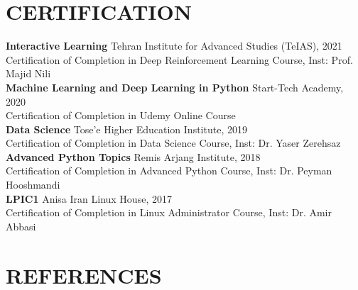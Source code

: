 \documentclass[11pt]{article}
\begin{document}
\section{CERTIFICATION}  

\textbf{Interactive Learning}  \hfill Tehran Institute for Advanced Studies (TeIAS), 2021\\
Certification of Completion in Deep Reinforcement Learning Course, Inst: Prof. Majid Nili	\href{https://scholar.google.com/citations?user=QlwWxmoAAAAJ&hl=en}{\small \faExternalLink}\\
\textbf{Machine Learning and Deep Learning in Python}  \hfill Start-Tech Academy, 2020\\
Certification of Completion in Udemy Online Course\\
\textbf{Data Science} \hfill Tose’e Higher Education Institute, 2019\\
Certification of Completion in Data Science Course, Inst: Dr. Yaser Zerehsaz \href{https://scholar.google.com/citations?user=QlwWxmoAAAAJ&hl=en}{\small \faExternalLink}\\
\textbf{Advanced Python Topics} \hfill Remis Arjang Institute, 2018\\
Certification of Completion in Advanced Python Course, Inst: Dr. Peyman Hooshmandi\\
\textbf{LPIC1} \hfill Anisa Iran Linux House, 2017\\
Certification of Completion in Linux Administrator Course, Inst: Dr. Amir Abbasi

\section{REFERENCES}
\end{document}
